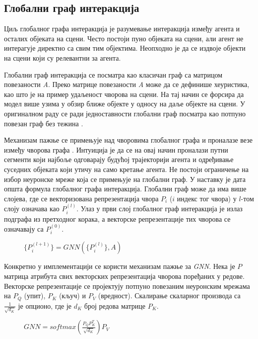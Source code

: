 \documentclass[11pt,oneside]{memoir}
\begin{document}
\subsection{Глобални граф интеракција}

Циљ глобалног графа интеракција је разумевање интеракција између агента и осталих објеката на сцени. Често постоји пуно објеката
на сцени, али агент не интерагује директно са свим тим објектима. Неопходно је да се издвоје објекти на сцени који су релевантни за агента.

Глобални граф интеракција се посматра као класичан граф са матрицом повезаности \textit{A}. Преко матрице повезаности \textit{A}
може да се дефинише хеуристика, као што је на пример удаљеност чворова на сцени. На тај начин се форсира да модел више узима у обзир ближе објекте
у односу на даље објекте на сцени.
У оригиналном раду се ради једноставности глобални граф посматра као потпуно повезан граф без тежина \cite{vectornet}.

Механизам пажње се примењује над
чворовима глобалног графа и проналазе везе између чворова графа \cite{attention_is_all_you_need}. Интуиција је да се на овај начин проналази путни сегменти који најбоље одговарају будућој трајекторији агента и
одређивање суседних објеката који утичу на само кретање агента. Не постоји ограничење на избор неуронске мреже која се примењује на глобални граф.
У наставку је дата општа формула глобалног графа интеракција. Глобални граф може да има више слојева, где
се векторизована репрезентација чвора $P_{i}$ ($i$ индекс тог чвора) у $l$-том слоју означава као $P_{i}^{(l)}$. 
Улаз у први слој глобалног граф интеракција је излаз подграфа из претходног корака, а векторске репрезентације тих чворова се означавају
са $P_{i}^{(0)}$.

\begin{figure}[H]
  \centering
  $\{P^{(l+1)}_{i}\} = GNN(\{P^{(l)}_{i}\}, A)$
\end{figure}

Конкретно у имплементацији се користи механизам пажње за \textit{GNN}.
Нека је $P$ матрица атрибута свих векторских репрезентација чворова поређаних у редове.
Векторске репрезентације се пројектују потпуно повезаним неуронским мрежама на $P_{Q}$ (упит), $P_{K}$ (кључ) и $P_{V}$ (вредност). 
Скалирање скаларног производа са $\frac{1}{\sqrt{d_{K}}}$ је опционо, где је $d_{K}$ број редова матрице $P_{K}$.

\begin{figure}[H]
  \centering
  $GNN = softmax(\frac{P_{Q}P^{T}_{K}}{\sqrt{d_{K}}})P_{V}$
\end{figure}
\end{document}
